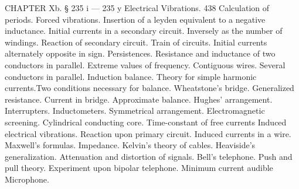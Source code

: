 CHAPTER Xb.
§ 235 i — 235 y Electrical Vibrations. 438
Calculation of periods. Forced vibrations. Insertion of a leyden equivalent
to a negative inductance. Initial currents in a secondary circuit. Inversely
as the number of windings. Reaction of secondary circuit.
Train of circuits. Initial currents alternately opposite in sign.
Persistences. Resistance and inductance of two conductors in parallel.
Extreme values of frequency. Contiguous wires. Several conductors in
parallel.  Induction balance. Theory for simple harmonic currents.Two
conditions necessary for balance. Wheatstone’s bridge. Generalized
resistance. Current in bridge. Approximate balance. Hughes' arrangement.
Interrupters. Inductometers. Symmetrical arrangement.
Electromagnetic screening. Cylindrical conducting core. Time-constant of
free currents Induced electrical vibrations. Reaction upon
primary circuit. Induced currents in a wire. Maxwell's formulas.
Impedance. Kelvin’s theory of cables. Heaviside’s generalization.
Attenuation and distortion of signals. Bell’s telephone. Push and
pull theory. Experiment upon bipolar telephone. Minimum current
audible Microphone.


